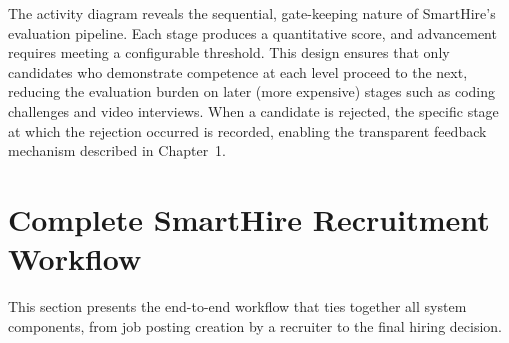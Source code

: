 The activity diagram reveals the sequential, gate-keeping nature of SmartHire's evaluation pipeline. Each stage produces a quantitative score, and advancement requires meeting a configurable threshold. This design ensures that only candidates who demonstrate competence at each level proceed to the next, reducing the evaluation burden on later (more expensive) stages such as coding challenges and video interviews. When a candidate is rejected, the specific stage at which the rejection occurred is recorded, enabling the transparent feedback mechanism described in Chapter~1.

\section{Complete SmartHire Recruitment Workflow}
\label{sec:complete-workflow}

This section presents the end-to-end workflow that ties together all system components, from job posting creation by a recruiter to the final hiring decision.

